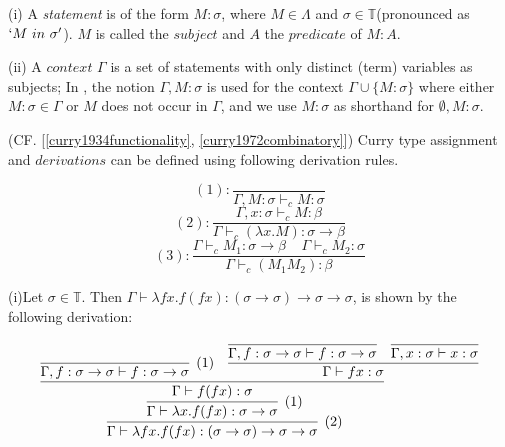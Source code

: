 \begin{def1}
\normalfont (i) A \textit{statement} is of the form $M : \sigma$, where $M\in \Lambda$ and $\sigma \in \mathbb{T}$(pronounced as $`M\ in\ \sigma'$). $M$ is called the $subject$ and $A$ the $predicate$ of $M : A$.  
\end{def1}
(ii) A $context$ $\Gamma$ is a set of statements with only distinct (term) variables as subjects; In \cite{svb2001type}, the notion $\Gamma,M:\sigma$ is used for the context $\Gamma \cup \{M:\sigma\}$ where either $M:\sigma \in \Gamma$ or $M$ does not occur in $\Gamma$, and we use $M:\sigma$ as shorthand for $\emptyset,M:\sigma$.


\begin{def1}
\normalfont (CF. [\ref{curry1934functionality}, \ref{curry1972combinatory}]) Curry type assignment and $derivations$ can be defined using following derivation rules.  
\end{def1}

\begin{equation*}
(1):\frac{}{\Gamma ,M:\sigma \vdash _cM:\sigma} 
\end{equation*}
\begin{equation*}
(2):\frac{\Gamma ,x:\sigma \vdash _cM:\beta}{\Gamma \vdash _c(\lambda x.M):\sigma \rightarrow \beta} 
\end{equation*}
\begin{equation*}
(3):\frac{\Gamma \vdash _cM_1:\sigma \rightarrow \beta\ \ \ \ \ \Gamma \vdash _cM_2:\sigma}{\Gamma \vdash _c(M_1M_2):\beta} 
\end{equation*}

\begin{exmp}
\normalfont (i)Let $\sigma \in \mathbb{T}$. Then $\Gamma \vdash \lambda fx.f(fx):(\sigma \rightarrow \sigma)\rightarrow \sigma \rightarrow \sigma$, is shown by the following derivation:
\end{exmp}

$$
\infer[(2)]{\Gamma \vdash \lambda fx.f(fx):(\sigma \rightarrow \sigma)\rightarrow \sigma \rightarrow \sigma}{
	\infer[(1)]{\Gamma \vdash \lambda x.f(fx):\sigma \rightarrow \sigma}{
      \infer{\Gamma \vdash f(fx):\sigma}{
             \infer[(1)]{\Gamma,f:\sigma \rightarrow \sigma \vdash f:\sigma \rightarrow \sigma}{}
             & 
             \infer{\Gamma \vdash fx:\sigma}{
                \infer{\Gamma,f:\sigma \rightarrow \sigma \vdash f:\sigma \rightarrow \sigma}{}
                &
                \infer{\Gamma,x:\sigma \vdash x:\sigma}{}
             }
         }
      }		
	}
$$


